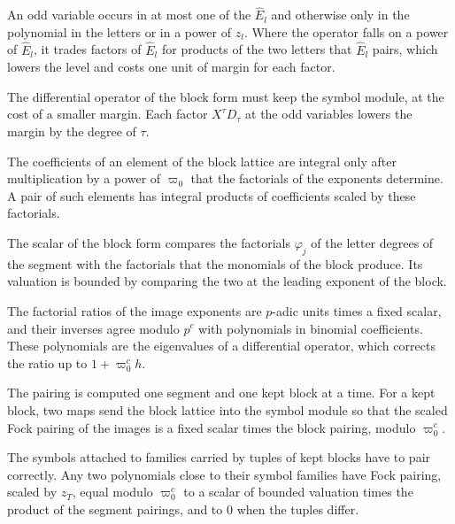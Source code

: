 An odd variable occurs in at most one of the $\hat E_l$ and otherwise only in the polynomial in the letters or in a power
of $z_l$. Where the operator falls on a power of $\hat E_l$, it trades factors of $\hat E_l$ for products of the two letters
that $\hat E_l$ pairs, which lowers the level and costs one unit of margin for each factor.

The differential operator of the block form must keep the symbol module, at the cost of a smaller margin. Each factor
$X^\tau D_\tau$ at the odd variables lowers the margin by the degree of $\tau$.

The coefficients of an element of the block lattice are integral only after multiplication by a power of $\varpi_0$ that
the factorials of the exponents determine. A pair of such elements has integral products of coefficients scaled by these
factorials.

The scalar of the block form compares the factorials $\varphi_j$ of the letter degrees of the segment with the factorials
that the monomials of the block produce. Its valuation is bounded by comparing the two at the leading exponent of the
block.

The factorial ratios of the image exponents are $p$-adic units times a fixed scalar, and their inverses agree modulo
$p^c$ with polynomials in binomial coefficients. These polynomials are the eigenvalues of a differential operator, which
corrects the ratio up to $1+\varpi_0^ch$.

The pairing is computed one segment and one kept block at a time. For a kept block, two maps send the block lattice into
the symbol module so that the scaled Fock pairing of the images is a fixed scalar times the block pairing, modulo
$\varpi_0^c$.

The symbols attached to families carried by tuples of kept blocks have to pair correctly. Any two polynomials close to
their symbol families have Fock pairing, scaled by $z_T$, equal modulo $\varpi_0^c$ to a scalar of bounded valuation times
the product of the segment pairings, and to $0$ when the tuples differ.

